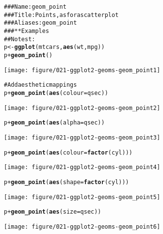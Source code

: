 \documentclass[a4paper,titlepage]{tufte-handout}\usepackage{graphicx, color}
\makeatletter
\def\maxwidth{ %
  \ifdim\Gin@nat@width>\linewidth
    \linewidth
  \else
    \Gin@nat@width
  \fi
}
\newcommand{\hlfunctioncall}[1]{\textcolor[rgb]{0.501960784313725,0,0.329411764705882}{\textbf{#1}}}%
\newcommand{\hlcomment}[1]{\textcolor[rgb]{0.180392156862745,0.6,0.341176470588235}{#1}}%
\newenvironment{kframe}{%
 \def\at@end@of@kframe{}%
 \ifinner\ifhmode%
  \def\at@end@of@kframe{\end{minipage}}%
  \begin{minipage}{\columnwidth}%
 \fi\fi%
 \def\FrameCommand##1{\hskip\@totalleftmargin \hskip-\fboxsep
 \colorbox{shadecolor}{##1}\hskip-\fboxsep
     \hskip-\linewidth \hskip-\@totalleftmargin \hskip\columnwidth}%
 \MakeFramed {\advance\hsize-\width
   \@totalleftmargin\z@ \linewidth\hsize
   \@setminipage}}%
 {\par\unskip\endMakeFramed%
 \at@end@of@kframe}
\newenvironment{knitrout}{}{} %
\makeatother
\begin{document}
\begin{knitrout}
\color{fgcolor}\begin{kframe}
\begin{alltt}
\hlcomment{### Name: geom_point}
\hlcomment{### Title: Points, as for a scatterplot}
\hlcomment{### Aliases: geom_point}
\hlcomment{### ** Examples}
\hlcomment{## No test: }
p <- \hlfunctioncall{ggplot}(mtcars, \hlfunctioncall{aes}(wt, mpg))
p + \hlfunctioncall{geom_point}()
\end{alltt}
\end{kframe}\texttt{[image: figure/021-ggplot2-geoms-geom\_point1]} \begin{kframe}\begin{alltt}
\hlcomment{# Add aesthetic mappings}
p + \hlfunctioncall{geom_point}(\hlfunctioncall{aes}(colour = qsec))
\end{alltt}
\end{kframe}\texttt{[image: figure/021-ggplot2-geoms-geom\_point2]} \begin{kframe}\begin{alltt}
p + \hlfunctioncall{geom_point}(\hlfunctioncall{aes}(alpha = qsec))
\end{alltt}
\end{kframe}\texttt{[image: figure/021-ggplot2-geoms-geom\_point3]} \begin{kframe}\begin{alltt}
p + \hlfunctioncall{geom_point}(\hlfunctioncall{aes}(colour = \hlfunctioncall{factor}(cyl)))
\end{alltt}
\end{kframe}\texttt{[image: figure/021-ggplot2-geoms-geom\_point4]} \begin{kframe}\begin{alltt}
p + \hlfunctioncall{geom_point}(\hlfunctioncall{aes}(shape = \hlfunctioncall{factor}(cyl)))
\end{alltt}
\end{kframe}\texttt{[image: figure/021-ggplot2-geoms-geom\_point5]} \begin{kframe}\begin{alltt}
p + \hlfunctioncall{geom_point}(\hlfunctioncall{aes}(size = qsec))
\end{alltt}
\end{kframe}\texttt{[image: figure/021-ggplot2-geoms-geom\_point6]} \begin{kframe}\begin{alltt}

\end{alltt}
\end{kframe}
\end{knitrout}
\end{document}
